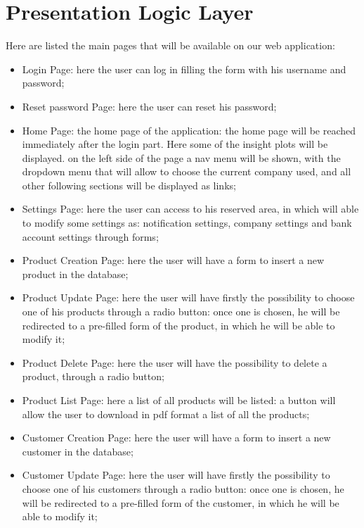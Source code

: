 \section{Presentation Logic Layer}


Here are listed the main pages that will be available on our web application:

\begin{itemize}
    \item Login Page: here the user can log in filling the form with his username and password;
    \item Reset password Page: here the user can reset his password;
    \item Home Page: the home page of the application: the home page will be reached immediately after the login part. Here some of the insight plots will be displayed. on the left side of the page a nav menu will be shown, with the dropdown menu that will allow to choose the current company used, and all other following sections will be displayed as links;
    \item Settings Page: here the user can access to his reserved area, in which will able to modify some settings as: notification settings, company settings and bank account settings through forms;
    \item Product Creation Page: here the user will have a form to insert a new product in the database;
    \item Product Update Page: here the user will have firstly the possibility to choose one of his products through a radio button: once one is chosen, he will be redirected to a pre-filled form of the product, in which he will be able to modify it;
    \item Product Delete Page: here the user will have the possibility to delete a product, through a radio button;
    \item Product List Page: here a list of all products will be listed: a button will allow the user to download in pdf format a list of all the products;
    \item Customer Creation Page: here the user will have a form to insert a new customer in the database;
    \item Customer Update Page: here the user will have firstly the possibility to choose one of his customers through a radio button: once one is chosen, he will be redirected to a pre-filled form of the customer, in which he will be able to modify it;

\end{itemize}

